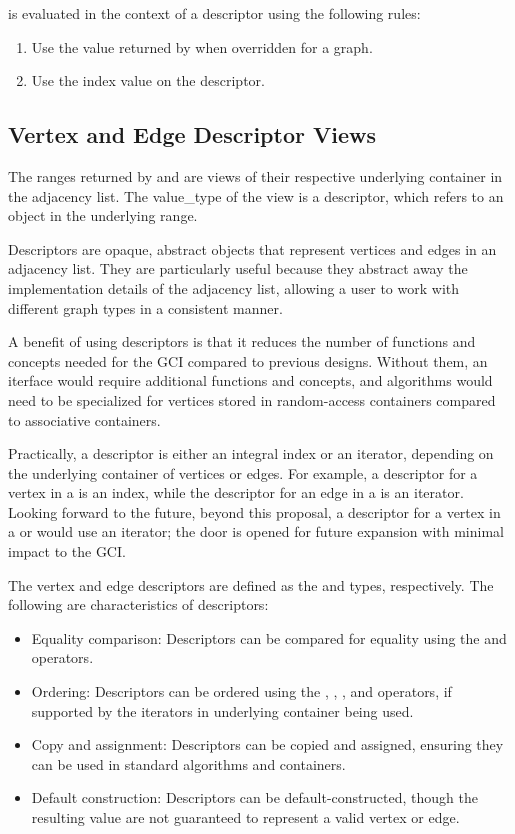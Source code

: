  is evaluated in the context of a descriptor using the following rules:
\begin{enumerate}
    \item Use the value returned by  when overridden for a graph.
    \item Use the index value on the descriptor.
\end{enumerate}

\subsection{Vertex and Edge Descriptor Views}
The ranges returned by  and  are views of their respective underlying 
container in the adjacency list. The value\_type of the view is a descriptor, which refers to an object in 
the underlying range.

Descriptors are opaque, abstract objects that represent vertices and edges in an adjacency list. They are 
particularly useful because they abstract away the implementation details of the adjacency list, allowing 
a user to work with different graph types in a consistent manner. 

A benefit of using descriptors is that it reduces the number of functions and concepts needed for the GCI
compared to previous designs. Without them, an iterface would require additional functions and concepts, 
and algorithms would need to be specialized for vertices stored in random-access containers compared to
associative containers.

Practically, a descriptor is either an integral index or an iterator, depending on the underlying container of vertices
or edges. For example, a descriptor for a vertex in a  is an index, while the descriptor for an edge in a
 is an iterator. Looking forward to the future, beyond this proposal, a descriptor for a vertex in a 
 or  would use an iterator; the door is opened for future expansion with minimal 
impact to the GCI.

The vertex and edge descriptors are defined as the  and  types, respectively. 
The following are characteristics of descriptors:
\begin{itemize}
    \item Equality comparison: Descriptors can be compared for equality using the \tcode{==} and \tcode{!=} operators.
    \item Ordering: Descriptors can be ordered using the \tcode{<}, \tcode{<=}, \tcode{>}, and \tcode{>=} operators, if supported 
          by the iterators in underlying container being used.
    \item Copy and assignment: Descriptors can be copied and assigned, ensuring they can be used in standard algorithms and containers.
    \item Default construction: Descriptors can be default-constructed, though the resulting value are not guaranteed to represent 
          a valid vertex or edge.
\end{itemize}

